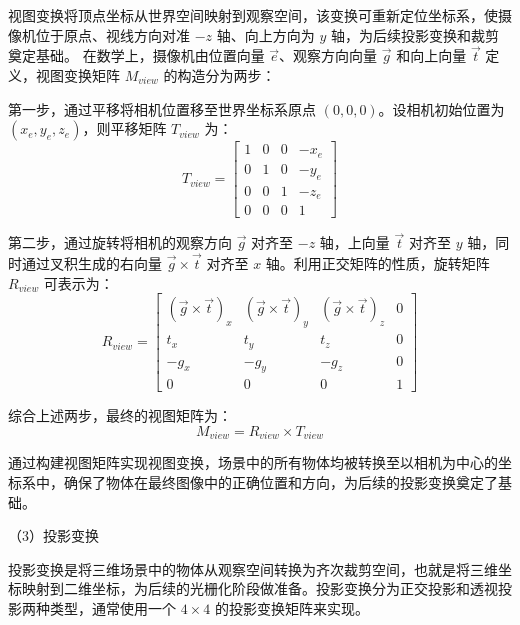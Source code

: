 视图变换将顶点坐标从世界空间映射到观察空间，该变换可重新定位坐标系，使摄像机位于原点、视线方向对准 $-z$ 轴、向上方向为 $y$ 轴，为后续投影变换和裁剪奠定基础。
在数学上，摄像机由位置向量 \(\vec{e}\)、观察方向向量 \(\vec{g}\) 和向上向量 \(\vec{t}\) 定义，视图变换矩阵 \(M_{view}\) 的构造分为两步：

第一步，通过平移将相机位置移至世界坐标系原点 $(0,0,0)$。设相机初始位置为 $
(x_e, y_e, z_e)$，则平移矩阵 $T_{view}$ 为：
\begin{equation}
T_{view} = 
\begin{bmatrix}
1 & 0 & 0 & -x_e \\
0 & 1 & 0 & -y_e \\
0 & 0 & 1 & -z_e \\
0 & 0 & 0 & 1
\end{bmatrix}
\tag{2-7}
\end{equation}


第二步，通过旋转将相机的观察方向 $\vec{g}$ 对齐至 $-z$ 轴，上向量 $\vec{t}$ 对齐至 $y$ 轴，同时通过叉积生成的右向量 $\vec{g} \times \vec{t}$ 对齐至 $x$ 轴。利用正交矩阵的性质，旋转矩阵 $R_{view}$ 可表示为：
\begin{equation}
R_{view} = 
\begin{bmatrix}
(\vec{g} \times \vec{t})_x & (\vec{g} \times \vec{t})_y & (\vec{g} \times \vec{t})_z & 0 \\
t_x & t_y & t_z & 0 \\
-g_x & -g_y & -g_z & 0 \\
0 & 0 & 0 & 1 
\end{bmatrix}
\tag{2-8}
\end{equation}

综合上述两步，最终的视图矩阵为：
\begin{equation}
M_{view} = R_{view} \times T_{view}
\tag{2-9}
\end{equation}

通过构建视图矩阵实现视图变换，场景中的所有物体均被转换至以相机为中心的坐标系中，确保了物体在最终图像中的正确位置和方向，为后续的投影变换奠定了基础。

（3）投影变换

投影变换是将三维场景中的物体从观察空间转换为齐次裁剪空间，也就是将三维坐标映射到二维坐标，为后续的光栅化阶段做准备。投影变换分为正交投影和透视投影两种类型，通常使用一个 $4 \times 4$ 的投影变换矩阵来实现。

